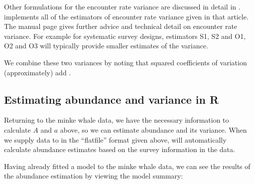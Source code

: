 \documentclass[article]{jss}
\begin{document}
Other formulations for the encounter rate variance are discussed in
detail in \citet{Fewster:2009ku}.  implements all of the
estimators of encounter rate variance given in that article. The
 manual page gives further advice and technical detail on
encounter rate variance. For example for systematic survey designs,
estimators S1, S2 and O1, O2 and O3 will typically provide smaller
estimates of the variance.

We combine these two variances by noting that squared coefficients of
variation (approximately) add \citep[often referred to as ``the delta
method'';][]{seber2002estimation}.

\subsection{Estimating abundance and variance in
R}\label{estimating-abundance-and-variance-in-r}

Returning to the minke whale data, we have the necessary information to
calculate \(A\) and \(a\) above, so we can estimate abundance and its
variance. When we supply data to  in the ``flatfile'' format
given above,  will automatically calculate abundance estimates
based on the survey information in the data.

Having already fitted a model to the minke whale data, we can see the
results of the abundance estimation by viewing the model summary:
\end{document}
